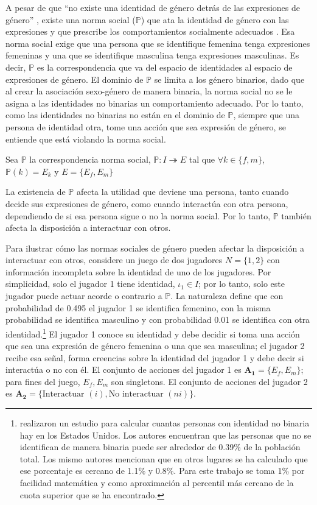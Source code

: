 A pesar de que ``no existe una identidad de género detrás de las expresiones de género'' \citep[p.~25]{butler2002gendertrouble}, existe una norma social ($\boldsymbol{\mathbb{P}}$) que ata la identidad de género con las expresiones y que prescribe los comportamientos socialmente adecuados \citep{akerlof2000economics}. Esa norma social exige que una persona que se identifique femenina tenga expresiones femeninas y una que se identifique masculina tenga expresiones masculinas. Es decir, $\boldsymbol{\mathbb{P}}$ es la correspondencia que va del espacio de identidades al espacio de expresiones de género. El dominio de  $\boldsymbol{\mathbb{P}}$ se limita a los género binarios, dado que al crear la asociación sexo-género de manera binaria, la norma social no se le asigna a las identidades no binarias un comportamiento adecuado. Por lo tanto, como las identidades no binarias no están en el dominio de $\mathbb{P}$, siempre que una persona de identidad otra, tome una acción que sea expresión de género, se entiende que está violando la norma social. 

\begin{framed}
\noindent Sea $\mathbb{P}$ la correspondencia norma social, $\mathbb{P}: I \twoheadrightarrow E$ tal que $\forall k \in \{f, m\}$, $\mathbb{P}(k)= E_k$ y $E=\{E_f,E_m\}$  
\end{framed}
La existencia de $\mathbf{\mathbb{P}}$ afecta la utilidad que deviene una persona, tanto cuando decide sus expresiones de género, como cuando interactúa con otra persona, dependiendo de si esa persona sigue o no la norma social. Por lo tanto, $\mathbf{\mathbb{P}}$ también afecta la disposición a interactuar con otros. 

Para ilustrar cómo las normas sociales de género pueden afectar la disposición a interactuar con otros, considere un juego de dos jugadores $N=\{1,2\}$ con información incompleta sobre la identidad de uno de los jugadores. Por simplicidad, solo el jugador 1 tiene identidad, $\iota_1 \in I$; por lo tanto, solo este jugador puede actuar acorde o contrario a $\mathbb{P}$. La naturaleza define que con probabilidad de 0.495 el jugador 1 se identifica femenino, con la misma probabilidad se identifica masculino y con probabilidad 0.01 se identifica con otra identidad.\footnote{\cite{meerwijk2017transgender} realizaron un estudio para calcular cuantas personas con identidad no binaria hay en los Estados Unidos. Los autores encuentran que las personas que no se identifican de manera binaria puede ser alrededor de 0.39\% de la población total. Los mismo autores mencionan que en otros lugares se ha calculado que ese porcentaje es cercano de 1.1\% y 0.8\%. Para este trabajo se toma 1\% por facilidad matemática y como aproximación al percentil más cercano de la cuota superior que se ha encontrado.} 
El jugador 1 conoce su identidad y debe decidir si toma una acción que sea una expresión de género femenina o una que sea masculina; el jugador 2 recibe esa señal, forma creencias sobre la identidad del jugador 1 y debe decir si interactúa o no con él. El conjunto de acciones del jugador 1 es $\mathbf{A_1}=\{E_f, E_m \}$; para fines del juego,  $E_f, E_m$ son singletons. El conjunto de acciones del jugador 2 es $\mathbf{A_2}=\{\text{Interactuar } (i), \text{No interactuar }(ni)\}$.

